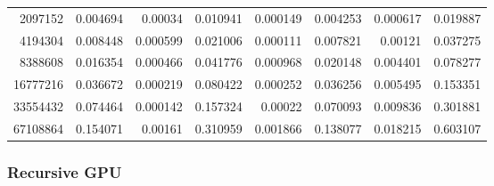 \begin{tabular}{r r r r r r r r}
2097152 & 0.004694 & 0.00034 & 0.010941 & 0.000149 & 0.004253 & 0.000617 & 0.019887 \\
4194304 & 0.008448 & 0.000599 & 0.021006 & 0.000111 & 0.007821 & 0.00121 & 0.037275 \\
8388608 & 0.016354 & 0.000466 & 0.041776 & 0.000968 & 0.020148 & 0.004401 & 0.078277 \\
16777216 & 0.036672 & 0.000219 & 0.080422 & 0.000252 & 0.036256 & 0.005495 & 0.153351 \\
33554432 & 0.074464 & 0.000142 & 0.157324 & 0.00022 & 0.070093 & 0.009836 & 0.301881 \\
67108864 & 0.154071 & 0.00161 & 0.310959 & 0.001866 & 0.138077 & 0.018215 & 0.603107 \\
\end{tabular}

\subsubsection{Recursive GPU}

